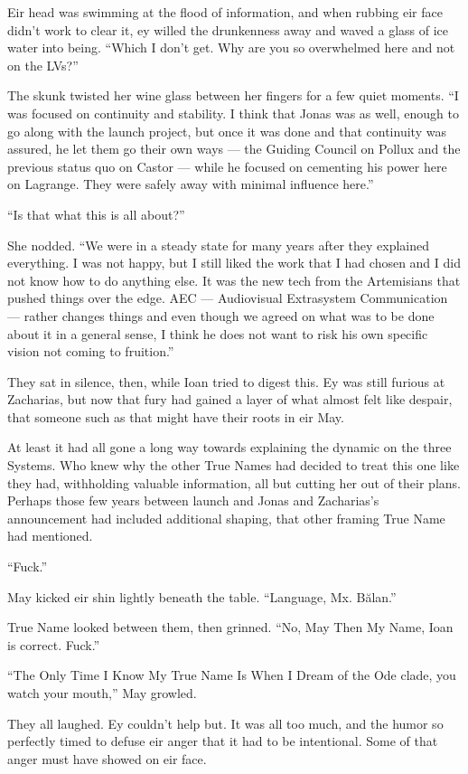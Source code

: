 Eir head was swimming at the flood of information, and when rubbing eir face didn't work to clear it, ey willed the drunkenness away and waved a glass of ice water into being. ``Which I don't get. Why are you so overwhelmed here and not on the LVs?''

The skunk twisted her wine glass between her fingers for a few quiet moments. ``I was focused on continuity and stability. I think that Jonas was as well, enough to go along with the launch project, but once it was done and that continuity was assured, he let them go their own ways — the Guiding Council on Pollux and the previous status quo on Castor — while he focused on cementing his power here on Lagrange. They were safely away with minimal influence here.''

``Is that what this is all about?''

She nodded. ``We were in a steady state for many years after they explained everything. I was not happy, but I still liked the work that I had chosen and I did not know how to do anything else. It was the new tech from the Artemisians that pushed things over the edge. AEC — Audiovisual Extrasystem Communication — rather changes things and even though we agreed on what was to be done about it in a general sense, I think he does not want to risk his own specific vision not coming to fruition.''

They sat in silence, then, while Ioan tried to digest this. Ey was still furious at Zacharias, but now that fury had gained a layer of what almost felt like despair, that someone such as that might have their roots in eir May.

At least it had all gone a long way towards explaining the dynamic on the three Systems. Who knew why the other True Names had decided to treat this one like they had, withholding valuable information, all but cutting her out of their plans. Perhaps those few years between launch and Jonas and Zacharias's announcement had included additional shaping, that other framing True Name had mentioned.

``Fuck.''

May kicked eir shin lightly beneath the table. ``Language, Mx. Bălan.''

True Name looked between them, then grinned. ``No, May Then My Name, Ioan is correct. Fuck.''

``The Only Time I Know My True Name Is When I Dream of the Ode clade, you watch your mouth,'' May growled.

They all laughed. Ey couldn't help but. It was all too much, and the humor so perfectly timed to defuse eir anger that it had to be intentional. Some of that anger must have showed on eir face.

